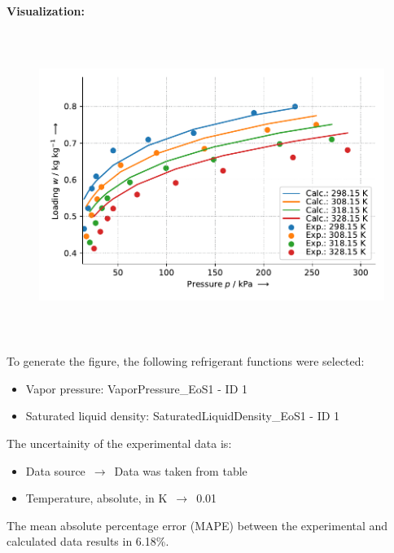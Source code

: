 \textbf{Visualization:}
%
\begin{figure}[!htp]
{\noindent\includegraphics[height=10cm, keepaspectratio]{figs/ads/ads_Butane_activated_carbon_powder_Maxsorb_III_DubininAstakhov_1.pdf}}
\end{figure}
%

To generate the figure, the following refrigerant functions were selected:
\begin{itemize}
\item Vapor pressure: VaporPressure\_EoS1 - ID 1
\item Saturated liquid density: SaturatedLiquidDensity\_EoS1 - ID 1
\end{itemize}

The uncertainity of the experimental data is:
\begin{itemize}
\item Data source $\,\to\,$ Data was taken from table
\item Temperature, absolute, in $\si{\kelvin}$ $\,\to\,$ 0.01
\end{itemize}

The mean absolute percentage error (MAPE) between the experimental and calculated data results in 6.18\%.
\FloatBarrier
\newpage
